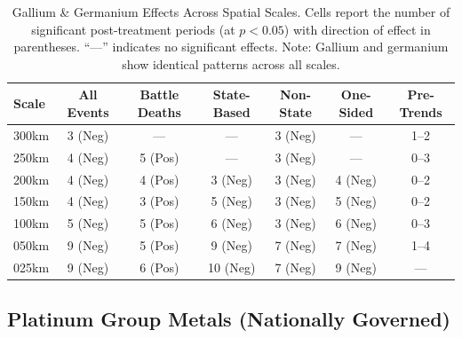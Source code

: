 \documentclass[11pt]{article}
\begin{document}


\begin{table}[H]
\centering
\caption{Gallium \& Germanium Effects Across Spatial Scales. Cells report the number of significant post-treatment periods (at $p<0.05$) with direction of effect in parentheses. ``---'' indicates no significant effects. Note: Gallium and germanium show identical patterns across all scales.}
\label{tab:gallium_germanium_robustness}
\begin{tabular}{lcccccc}
\toprule
Scale & All Events & Battle Deaths & State-Based & Non-State & One-Sided & Pre-Trends \\
\midrule
300km & 3 (Neg)   & ---           & ---         & 3 (Neg)   & ---       & 1--2       \\
250km & 4 (Neg)   & 5 (Pos)       & ---         & 3 (Neg)   & ---       & 0--3       \\
200km & 4 (Neg)   & 4 (Pos)       & 3 (Neg)     & 3 (Neg)   & 4 (Neg)   & 0--2       \\
150km & 4 (Neg)   & 3 (Pos)       & 5 (Neg)     & 3 (Neg)   & 5 (Neg)   & 0--2       \\
100km & 5 (Neg)   & 5 (Pos)       & 6 (Neg)     & 3 (Neg)   & 6 (Neg)   & 0--3       \\
050km & 9 (Neg)   & 5 (Pos)       & 9 (Neg)     & 7 (Neg)   & 7 (Neg)   & 1--4       \\
025km & 9 (Neg)   & 6 (Pos)       & 10 (Neg)    & 7 (Neg)   & 9 (Neg)   & ---        \\
\bottomrule
\end{tabular}
\end{table}

\subsection{Platinum Group Metals (Nationally Governed)}






\end{document}
